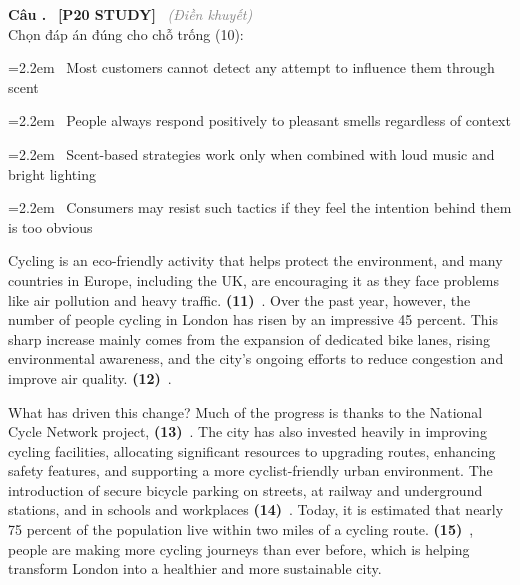 \documentclass[12pt,a4paper,twoside]{article}
\newcounter{qcounter}
\newcommand{\question}[2][]{%
    \stepcounter{qcounter}%
    \par\vspace{6pt}%
    \noindent\textcolor{primaryBlue}{\textbf{Câu \theqcounter.}}~%
    \textcolor{secondaryBlue}{\small\textbf{[P20 STUDY]}}~%
    \if\relax\detokenize{#1}\relax\else\textcolor{gray}{\small\textit{(#1)}}~\fi\\[1pt]
    \noindent #2%
}
\newcommand{\choiceitem}[2]{%
    \tikz[baseline=-0.5ex]{%
        \node[draw=primaryBlue, circle, minimum size=1.5em, inner sep=0pt, thick] {\textbf{#1}};%
    }~#2%
}
\newenvironment{readingpassage}[1][]{%
    \begin{tcolorbox}[enhanced, colback=grayLight, colframe=secondaryBlue,
        coltitle=textDark, fonttitle=\bfseries, title={#1},
        rounded corners, arc=3mm, boxrule=1pt,
        left=15pt, right=15pt, top=10pt, bottom=10pt,
        breakable, before skip=10pt, after skip=10pt, drop fuzzy shadow]
    \setstretch{1.3}
}{\end{tcolorbox}}
\begin{document}
\question[Điền khuyết]{Chọn đáp án đúng cho chỗ trống (10):}

\par\vspace{4pt}
\noindent\hangindent=2.2em\choiceitem{A}{Most customers cannot detect any attempt to influence them through scent}\par\vspace{4pt}
\noindent\hangindent=2.2em\choiceitem{B}{People always respond positively to pleasant smells regardless of context}\par\vspace{4pt}
\noindent\hangindent=2.2em\choiceitem{C}{Scent-based strategies work only when combined with loud music and bright lighting}\par\vspace{4pt}
\noindent\hangindent=2.2em\choiceitem{D}{Consumers may resist such tactics if they feel the intention behind them is too obvious}\par\vspace{4pt}

\begin{readingpassage}[]
Cycling is an eco-friendly activity that helps protect the environment, and many countries in Europe, including the UK, are encouraging it as they face problems like air pollution and heavy traffic. \textbf{(11)}~\underline{\hspace{1.3cm}}. Over the past year, however, the number of people cycling in London has risen by an impressive 45 percent. This sharp increase mainly comes from the expansion of dedicated bike lanes, rising environmental awareness, and the city's ongoing efforts to reduce congestion and improve air quality. \textbf{(12)}~\underline{\hspace{1.3cm}}.

What has driven this change? Much of the progress is thanks to the National Cycle Network project, \textbf{(13)}~\underline{\hspace{1.3cm}}. The city has also invested heavily in improving cycling facilities, allocating significant resources to upgrading routes, enhancing safety features, and supporting a more cyclist-friendly urban environment. The introduction of secure bicycle parking on streets, at railway and underground stations, and in schools and workplaces \textbf{(14)}~\underline{\hspace{1.3cm}}. Today, it is estimated that nearly 75 percent of the population live within two miles of a cycling route. \textbf{(15)}~\underline{\hspace{1.3cm}}, people are making more cycling journeys than ever before, which is helping transform London into a healthier and more sustainable city.
\end{readingpassage}
\end{document}
